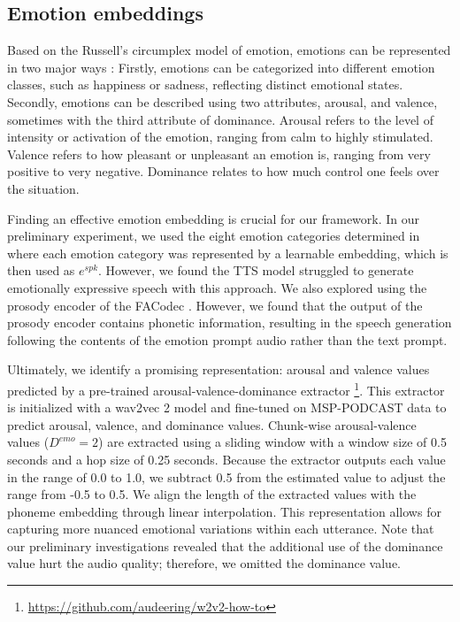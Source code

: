 \vspace{-.5em}
\subsection{Emotion embeddings}
\label{ssec:feature}
\vspace{-.5em}
Based on the Russell's circumplex model of emotion,
emotions can be represented in two major ways \cite{russell1980circumplex}:
Firstly, emotions can be categorized into different emotion classes, such as happiness or sadness, reflecting distinct emotional states. 
Secondly, emotions can be described using two attributes, arousal, and valence, sometimes with the third attribute of dominance. 
Arousal refers to the level of intensity or activation of the emotion, ranging from calm to highly stimulated.
Valence refers to how pleasant or unpleasant an emotion is, ranging from very positive to very negative.
Dominance relates to how much control one feels over the situation.

Finding an effective emotion embedding is crucial for our framework. 
In our preliminary experiment,
we used the eight emotion categories determined in \cite{lotfian2017building}
where each emotion category was represented by a learnable embedding,
which is then used as $e^{spk}$.
However, we found the TTS model struggled to generate emotionally expressive speech with this approach. %
We also explored using the prosody encoder of the FACodec \cite{ju2024naturalspeech}. However, we found that the output of the prosody encoder contains phonetic information, resulting in the speech generation following the contents of the emotion prompt audio rather than the text prompt.

Ultimately, we identify a promising representation: arousal and valence values
predicted by a pre-trained arousal-valence-dominance extractor \cite{wagner2023dawn}\footnote{\label{fn:aro-val}\url{https://github.com/audeering/w2v2-how-to}}. 
This extractor is initialized with a wav2vec 2 model \cite{baevski2020wav2vec} and fine-tuned on MSP-PODCAST data \cite{lotfian2017building} to predict arousal, valence, and dominance values. 
Chunk-wise arousal-valence values ($D^{emo}=2$) are extracted using a sliding window with a window size of 0.5 seconds and a hop size of 0.25 seconds. 
Because the extractor outputs each value in the range of 0.0 to 1.0, we subtract 0.5 from the estimated value to adjust the range from -0.5 to 0.5.
We align the length of the extracted values with the phoneme embedding through linear interpolation.
This representation allows for capturing more nuanced emotional variations within each utterance.
Note that 
our preliminary investigations revealed that the additional use of the dominance value hurt the audio quality; therefore, we omitted the dominance value.


